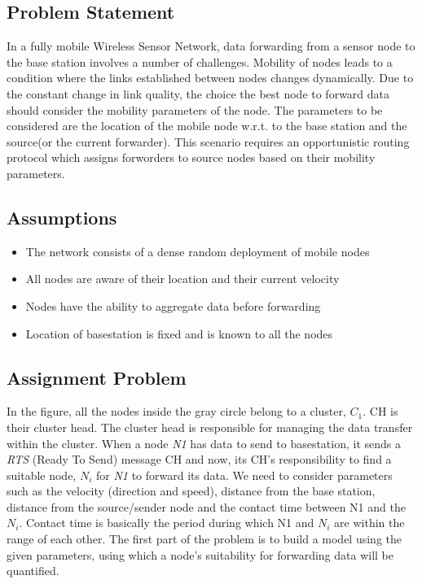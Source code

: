\subsection{Problem Statement}

In a fully mobile Wireless Sensor Network, data forwarding from a sensor node to the base station involves a number of challenges. Mobility of nodes leads to a condition where the links established between nodes changes dynamically. Due to the constant change in link quality, the choice the best node to forward data should consider the mobility parameters of the node. The parameters to be considered are the location of the mobile node w.r.t. to the base station and the source(or the current forwarder). This scenario requires an opportunistic routing protocol which assigns forworders to source nodes based on their mobility parameters.

\subsection{Assumptions}
\begin{itemize}
	\item The network consists of a dense random deployment of mobile nodes 
	\item All nodes are aware of their location and their current velocity
	\item Nodes have the ability to aggregate data before forwarding
	\item Location of basestation is fixed and is known to all the nodes
\end{itemize}


\subsection{Assignment Problem}
\label{assgn_prob}
In the figure, all the nodes inside the gray circle belong to a cluster, $C_1$. CH is their cluster head. The cluster head is responsible for managing the data transfer within the cluster. When a node \emph{N1} has data to send to basestation, it sends a \emph{RTS} (Ready To Send) message CH and now, its CH's responsibility to find a suitable node, \emph{$N_i$} for \emph{N1} to forward its data. We need to consider parameters such as the velocity (direction and speed), distance from the base station, distance from the source/sender node and the contact time between N1 and the $N_i$. Contact time is basically the period during which N1 and $N_i$ are within the range of each other. The first part of the problem is to build a model using the given parameters, using which a node's suitability for forwarding data will be quantified. \\

